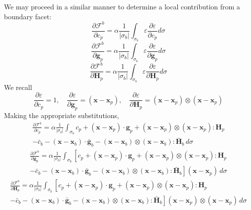\documentclass[11pt]{article} %
\begin{document}
We may proceed in a similar manner to determine a local contribution from a boundary facet:
\begin{equation}
	\frac{\partial \mathcal{F}^b}{\partial c_p} = \alpha \frac{1}{| \sigma_b |} \int_{\sigma_b} \varepsilon \frac{\partial \varepsilon}{\partial c_p} d \sigma
\end{equation}
\begin{equation}
	\frac{\partial \mathcal{F}^b}{\partial \mathbf{g}_p} = \alpha \frac{1}{| \sigma_b |} \int_{\sigma_b} \varepsilon \frac{\partial \varepsilon}{\partial \mathbf{g}_p} d \sigma
\end{equation}
\begin{equation}
	\frac{\partial \mathcal{F}^b}{\partial \mathbf{H}_p} = \alpha \frac{1}{| \sigma_b |} \int_{\sigma_b} \varepsilon \frac{\partial \varepsilon}{\partial \mathbf{H}_p} d \sigma
\end{equation}
We recall
\begin{equation}
	\frac{\partial \varepsilon}{\partial c_p} = 1, \quad \frac{\partial \varepsilon}{\partial \mathbf{g}_p} = (\mathbf{x} - \mathbf{x}_p), \quad \frac{\partial \varepsilon}{\partial \mathbf{H}_p} = (\mathbf{x} - \mathbf{x}_p) \otimes (\mathbf{x} - \mathbf{x}_p)
\end{equation}
Making the appropriate substitutions,
\begin{eqnarray}
	\frac{\partial \mathcal{F}^b}{\partial c_p} = \alpha \frac{1}{| \sigma_b |} \int_{\sigma_b} c_p + (\mathbf{x} - \mathbf{x}_p) \cdot \mathbf{g}_p + (\mathbf{x} - \mathbf{x}_p) \otimes (\mathbf{x} - \mathbf{x}_p) \colon \mathbf{H}_p \nonumber \\ - \bar{c}_b - (\mathbf{x} - \mathbf{x}_b) \cdot \bar{\mathbf{g}}_b - (\mathbf{x} - \mathbf{x}_b) \otimes (\mathbf{x} - \mathbf{x}_b) \colon \bar{\mathbf{H}}_b \, d \sigma
\end{eqnarray}
\begin{eqnarray}
	\frac{\partial \mathcal{F}^b}{\partial \mathbf{g}_p} = \alpha \frac{1}{| \sigma_b |} \int_{\sigma_b} \left[ c_p + (\mathbf{x} - \mathbf{x}_p) \cdot \mathbf{g}_p + (\mathbf{x} - \mathbf{x}_p) \otimes (\mathbf{x} - \mathbf{x}_p) \colon \mathbf{H}_p \right. \nonumber \\ \left. - \bar{c}_b - (\mathbf{x} - \mathbf{x}_b) \cdot \bar{\mathbf{g}}_b - (\mathbf{x} - \mathbf{x}_b) \otimes (\mathbf{x} - \mathbf{x}_b) \colon \bar{\mathbf{H}}_b \right] (\mathbf{x} - \mathbf{x}_p) \, d \sigma
\end{eqnarray}
\begin{eqnarray}
	\frac{\partial \mathcal{F}^b}{\partial \mathbf{H}_p} = \alpha \frac{1}{| \sigma_b |} \int_{\sigma_b} \left[ c_p + (\mathbf{x} - \mathbf{x}_p) \cdot \mathbf{g}_p + (\mathbf{x} - \mathbf{x}_p) \otimes (\mathbf{x} - \mathbf{x}_p) \colon \mathbf{H}_p \right. \nonumber \\ \left. - \bar{c}_b - (\mathbf{x} - \mathbf{x}_b) \cdot \bar{\mathbf{g}}_b - (\mathbf{x} - \mathbf{x}_b) \otimes (\mathbf{x} - \mathbf{x}_b) \colon \bar{\mathbf{H}}_b \right] (\mathbf{x} - \mathbf{x}_p) \otimes (\mathbf{x} - \mathbf{x}_p) \, d \sigma
\end{eqnarray}
\end{document}
